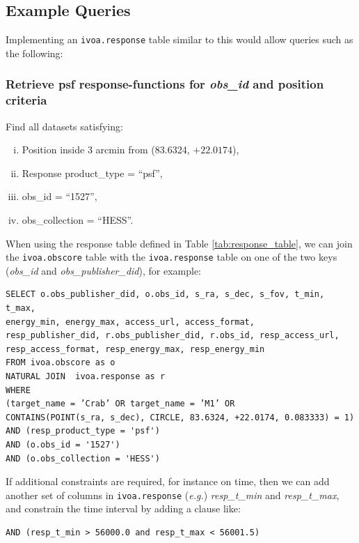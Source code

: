 \subsection*{Example Queries}
\noindent Implementing an {\tt ivoa.response} table similar to this would allow queries such as the following:
\subsubsection*{Retrieve {\bf psf} {\bf response-function}s for {\em obs\_id\/} and position criteria}
\noindent Find all datasets satisfying:
\begin{enumerate}[(i)]
 \item Position inside 3 arcmin from (83.6324, $+22.0174$),
 \item Response product\_type = ``psf'',
 \item obs\_id = ``1527'',
 \item obs\_collection = ``HESS''.
\end{enumerate}

When using the response table defined in Table \ref{tab:response_table}, we can join the {\tt ivoa.obscore} table with the {\tt ivoa.response} table on one of the two keys ({\em obs\_id\/} and {\em obs\_publisher\_did\/}), for example: 
{\small
\begin{verbatim}
SELECT o.obs_publisher_did, o.obs_id, s_ra, s_dec, s_fov, t_min, t_max, 
energy_min, energy_max, access_url, access_format, 
resp_publisher_did, r.obs_publisher_did, r.obs_id, resp_access_url,
resp_access_format, resp_energy_max, resp_energy_min
FROM ivoa.obscore as o
NATURAL JOIN  ivoa.response as r
WHERE
(target_name = ’Crab’ OR target_name = ’M1’ OR
CONTAINS(POINT(s_ra, s_dec), CIRCLE, 83.6324, +22.0174, 0.083333) = 1)
AND (resp_product_type = 'psf')
AND (o.obs_id = '1527')
AND (o.obs_collection = 'HESS')
\end{verbatim}
}
If additional constraints are required, for instance on time, then we can add another set of columns  in {\tt ivoa.response} ({\em e.g.\/}) {\em resp\_t\_min\/} and {\em resp\_t\_max\/}, and constrain the time interval by adding a clause like:
{\small
\begin{verbatim}
AND (resp_t_min > 56000.0 and resp_t_max < 56001.5) 
\end{verbatim}
}

